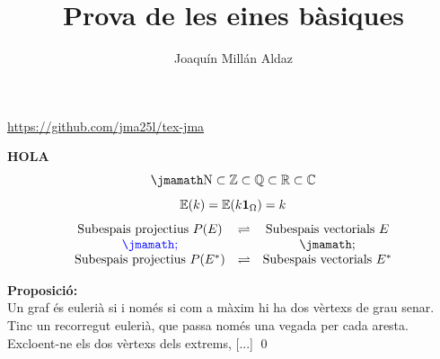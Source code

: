 \documentclass[catalan, aspectratio=169]{beamer}
\title{Prova de les eines bàsiques}
\author{Joaquín Millán Aldaz}
\begin{document}
\begin{frame}
	\titlepage
	\url{https://github.com/jma25l/tex-jma}
\end{frame}
\begin{frame}
	\centering
	\textbf{HOLA}\\
	\[\N \subset \Z \subset \Q \subset \R \subset \C \]
	\[\mathbb E(k) = \mathbb E(k\mathbf{1}_\Omega) = k\]
	\[
		\begin{array}{ccc}
		\text{Subespais projectius } P(E) & \biy & \text{Subespais vectorials }E\\
		{\color{blue} \biyV} & & \biyV\\ 
			\text{Subespais projectius } P(E^{*}) & \biy & \text{Subespais vectorials }E^{*}\\
		\end{array}
	\]
\end{frame}
\begin{frame}
	\textbf{Proposició: }\\
	Un graf és eulerià si i només si com a màxim hi ha dos vèrtexs de grau senar. 
	\directa
	Tinc un recorregut eulerià, que passa només una vegada per cada aresta. Excloent-ne els dos vèrtexs dels extrems, [...]
	\reciproc
	[...] 
	\qed
\end{frame}
\begin{frame}
	\centering
	
\end{frame}
\end{document}
